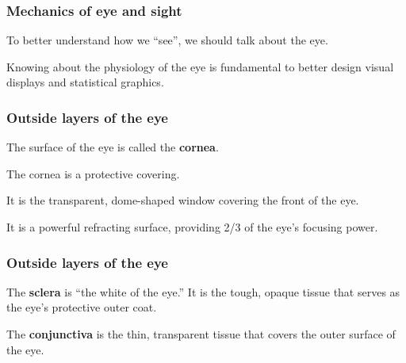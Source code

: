 \documentclass[12pt]{beamer}\usepackage[]{graphicx}\usepackage[]{color}
\begin{document}

\begin{frame}
\frametitle{Mechanics of eye and sight}

\bbi
  \item To better understand how we ``see'', we should talk about the eye.
  \item Knowing about the physiology of the eye is fundamental to better
  design visual displays and statistical graphics.
\ei

\end{frame}


\begin{frame}
\begin{center}
\end{center}
\end{frame}


\begin{frame}
\frametitle{Outside layers of the eye}

\bbi
  \item The surface of the eye is called the \textbf{cornea}.
  \item The cornea is a protective covering.
  \item It is the transparent, dome-shaped window covering
  the front of the eye. 
  \item It is a powerful refracting surface, providing 2/3
  of the eye's focusing power.
\ei
\eb

\end{frame}


\begin{frame}
\frametitle{Outside layers of the eye}

\bbi
  \item The \textbf{sclera} is ``the white of the eye.'' It is the tough, 
  opaque tissue that serves as the eye's protective outer coat.
  \item The \textbf{conjunctiva} is the thin, transparent tissue that covers
  the outer surface of the eye.
\ei
\eb

\end{frame}

\end{document}
